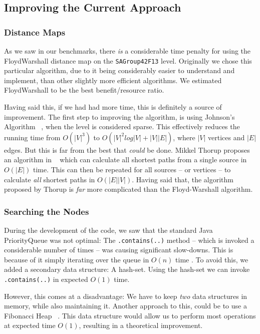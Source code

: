 \documentclass[letterpaper]{article}
\begin{document}
	\subsection{Improving the Current Approach} 

		\subsubsection{Distance Maps}
			As we saw in our benchmarks, there \emph{is} a considerable time penalty for using the FloydWarshall distance map on the \verb=SAGroup42F13= level. Originally we chose this particular algorithm, due to it being considerably easier to understand and implement, than other slightly more efficient algorithms. We estimated FloydWarshall to be the best benefit/resource ratio.

			Having said this, if we had had more time, this is definitely a source of improvement. The first step to improving the algorithm, is using Johnson's Algorithm ~\cite{jonhson}, when the level is considered sparse. This effectively reduces the running time from $O(|V|^3)$ to $O(|V|^2log|V|+|V||E|)$, where $|V|$ vertices and $|E|$ edges. But this is far from the best that \emph{could} be done. Mikkel Thorup proposes an algorithm in ~\cite{thorup} which can calculate all shortest paths from a single source in $O(|E|)$ time. This can then be repeated for all sources -- or vertices -- to calculate \emph{all} shortest paths in $O(|E||V|)$. Having said that, the algorithm proposed by Thorup is \emph{far} more complicated than the Floyd-Warshall algorithm.


		\subsubsection{Searching the Nodes}
			During the development of the code, we saw that the standard Java PriorityQueue was not optimal: The \verb=.contains(..)= method -- which is invoked a considerable number of times -- was causing significant slow-downs. This is because of it simply iterating over the queue in $O(n)$ time \cite{website:Java-Docs}. To avoid this, we added a secondary data structure: A hash-set. Using the hash-set we can invoke \verb=.contains(..)= in expected $O(1)$ time.

			However, this comes at a disadvantage: We have to keep \emph{two} data structures in memory, while also maintaining it. Another approach to this, could be to use a Fibonacci Heap ~\cite{fibonacci}. This data structure would allow us to perform most operations at expected time $O(1)$, resulting in a theoretical improvement.
\end{document}
